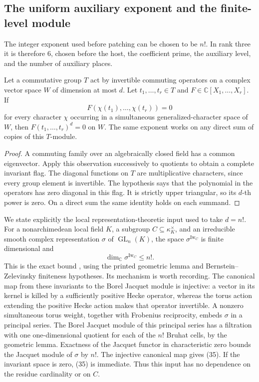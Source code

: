 \subsection{The uniform auxiliary exponent and the finite-level module}
\label{sec:uniform-aux-exponent}

The integer exponent used before patching can be chosen to be
$n!$.  In rank three it is therefore $6$, chosen before the
host, the coefficient prime, the auxiliary level, and the
number of auxiliary places.

\begin{srlemma}
\label{lem:torus-uniform-nil}
Let a commutative group $T$ act by invertible commuting operators
on a complex vector space $W$ of dimension at most $d$.
Let $t_1,\ldots,t_r\in T$ and $F\in\mathbb C[X_1,\ldots,X_r]$.
If
\[
            F(\chi(t_1),\ldots,\chi(t_r))=0
\]
for every character $\chi$ occurring in a simultaneous
generalized-character space of $W$, then
$F(t_1,\ldots,t_r)^d=0$ on $W$.
The same exponent works on any direct sum of copies of this
$T$-module.
\end{srlemma}
\begin{proof}
A commuting family over an algebraically closed field has a
common eigenvector.  Apply this observation successively to
quotients to obtain a complete invariant flag.
The diagonal functions on $T$ are multiplicative characters,
since every group element is invertible.
The hypothesis says that the polynomial in the operators has
zero diagonal in this flag.  It is strictly upper triangular,
so its $d$-th power is zero.
On a direct sum the same identity holds on each summand.
\end{proof}

We state explicitly the local representation-theoretic input
used to take $d=n!$.
For a nonarchimedean local field $K$, a subgroup
$C\subseteq\kappa_K^\times$, and an irreducible smooth complex
representation $\sigma$ of $\operatorname{GL}_n(K)$, the space
$\sigma^{\operatorname{Iw}_C}$ is finite dimensional and
\[
                   \dim_\mathbb C
                      \sigma^{\operatorname{Iw}_C}\leq n!.
                                                               \tag{35}
\]
This is the exact bound ,
using the printed geometric lemma and Bernstein--Zelevinsky
finiteness hypotheses.
Its mechanism is worth recording.
The canonical map from these invariants to the Borel Jacquet
module is injective: a vector in its kernel is killed by a
sufficiently positive Hecke operator, whereas the torus action
extending the positive Hecke action makes that operator
invertible.  A nonzero simultaneous torus weight, together
with Frobenius reciprocity, embeds $\sigma$ in a principal
series.  The Borel Jacquet module of this principal series has
a filtration with one one-dimensional quotient for each of
the $n!$ Bruhat cells, by the geometric lemma.
Exactness of the Jacquet functor in characteristic zero bounds
the Jacquet module of $\sigma$ by $n!$.
The injective canonical map gives (35).
If the invariant space is zero, (35) is immediate.
Thus this input has no dependence on the residue cardinality
or on $C$.

